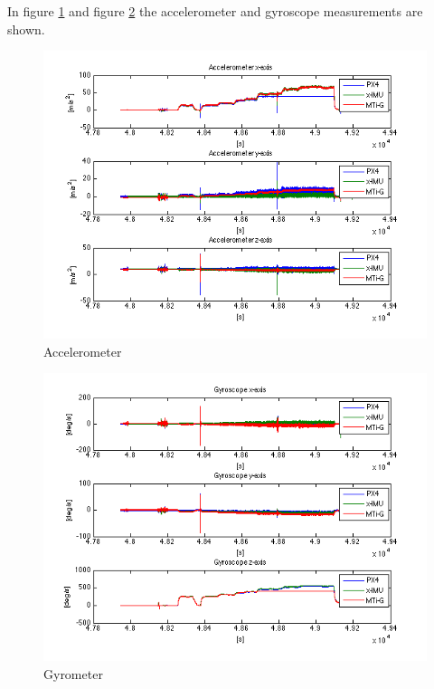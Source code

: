 In figure \ref{ct_acc} and figure \ref{ct_gyro} the accelerometer and gyroscope measurements are shown. 
\begin{figure}[h]
\includegraphics[width=1\textwidth]{pictures/ct_acc.png}
\caption{Accelerometer}
\label{ct_acc}
\end{figure}
\begin{figure}[hb]
\includegraphics[width=1\textwidth]{pictures/ct_gyro.png}
\caption{Gyrometer}
\label{ct_gyro}
\end{figure}
